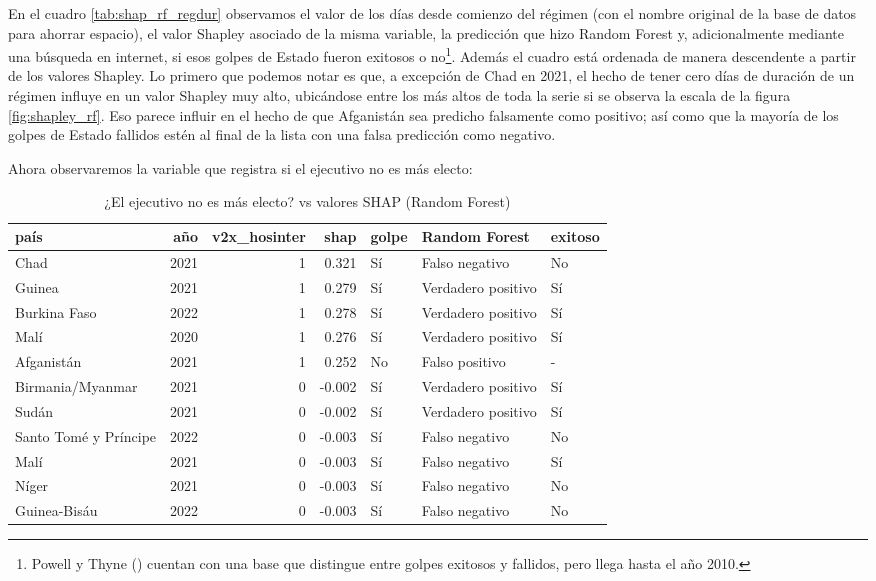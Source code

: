 \documentclass{article}
\begin{document}
En el cuadro \ref{tab:shap_rf_regdur} observamos el valor de los días desde comienzo del régimen
(con el nombre original de la base de datos para ahorrar espacio), el valor Shapley asociado de la 
misma variable, la predicción que hizo Random Forest y, adicionalmente mediante una búsqueda en 
internet, si esos golpes de Estado fueron exitosos o no\footnote{Powell y Thyne (\citeyear{Pow11}) 
cuentan con una base que distingue entre golpes exitosos y fallidos, pero llega hasta el año 2010.}. 
Además el cuadro está ordenada de manera descendente a partir de los valores Shapley. Lo primero que 
podemos notar es que, a excepción de Chad en 2021, el hecho de tener cero días de duración de un 
régimen influye en un valor Shapley muy alto, ubicándose entre los más altos de toda la serie si se 
observa la escala de la figura \ref{fig:shapley_rf}. Eso parece influir en el hecho de que Afganistán 
sea predicho falsamente como positivo; así como que la mayoría de los golpes de Estado fallidos estén 
al final de la lista con una falsa predicción como negativo.

Ahora observaremos la variable que registra si el ejecutivo no es más electo:

\begin{table}[H]
  \centering
  \begin{tabular}{lrrrlll}
    \toprule
    país & año & v2x\_hosinter & shap & golpe & Random Forest & exitoso \\
    \midrule
    Chad & 2021 & 1 & 0.321 & Sí & Falso negativo & No \\
    Guinea & 2021 & 1 & 0.279 & Sí & Verdadero positivo & Sí \\
    Burkina Faso & 2022 & 1 & 0.278 & Sí & Verdadero positivo & Sí \\
    Malí & 2020 & 1 & 0.276 & Sí & Verdadero positivo & Sí \\
    Afganistán & 2021 & 1 & 0.252 & No & Falso positivo & - \\
    Birmania/Myanmar & 2021 & 0 & -0.002 & Sí & Verdadero positivo & Sí \\
    Sudán & 2021 & 0 & -0.002 & Sí & Verdadero positivo & Sí \\
    Santo Tomé y Príncipe & 2022 & 0 & -0.003 & Sí & Falso negativo & No \\
    Malí & 2021 & 0 & -0.003 & Sí & Falso negativo & Sí \\
    Níger & 2021 & 0 & -0.003 & Sí & Falso negativo & No \\
    Guinea-Bisáu & 2022 & 0 & -0.003 & Sí & Falso negativo & No \\
    \bottomrule
    \end{tabular}
\caption{¿El ejecutivo no es más electo? vs valores SHAP (Random Forest) \label{tab:shap_rf_hosinter}}
\end{table}
\end{document}
